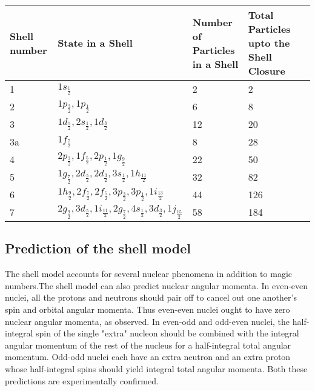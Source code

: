 \begin{table}[H]
	\centering
	\renewcommand*{\arraystretch}{1.2}
	\begin{tabular}{|p{2cm}| p{5cm}|p{2cm}|p{2cm}|p{2.5cm}|}
		\hline	
Shell number&State in a Shell&Number of Particles in a Shell&Total Particles upto the Shell Closure\\
\hline
1&$1 s_{\frac{1}{2}}$&2&2\\
2&$1 p_{\frac{3}{2}}, 1 p_{\frac{1}{2}}$&6&8\\
3&$1 d_{\frac{5}{2}}, 2 s_{\frac{1}{2}}, 1 d_{\frac{3}{2}}$&12&20\\
3a&$1 f_{\frac{7}{2}}$&8&28\\
4&$2 p_{\frac{3}{2}}, 1 f_{\frac{5}{2}}, 2 p_{\frac{1}{2}}, 1 g_{\frac{9}{2}}$&22&50\\
5&$1 g_{\frac{7}{2}}, 2 d_{\frac{5}{2}}, 2 d_{\frac{3}{2}}, 3 s_{\frac{1}{2}}, 1 h_{\frac{11}{2}}$&32&82\\
6&$1 h_{\frac{9}{2}}, 2 f_{\frac{7}{2}}, 2 f_{\frac{5}{2}}, 3 p_{\frac{3}{2}}, 3 p_{\frac{1}{2}}, 1 i_{\frac{13}{2}}$&44&126\\
7&$2 g_{\frac{9}{2}}, 3 d_{\frac{5}{2}}, 1 i_{\frac{11}{2}}, 2 g_{\frac{7}{2}}, 4 s_{\frac{1}{2}}, 3 d_{\frac{3}{2}}, 1 j_{\frac{15}{2}}$&58&184\\
\hline
	\end{tabular}
\end{table}
\subsection{Prediction of the shell model}
The shell model accounts for several nuclear phenomena in addition to magic numbers.The shell model can also predict nuclear angular momenta. In even-even nuclei, all the protons and neutrons should pair off to cancel out one another's spin and orbital angular momenta. Thus even-even nuclei ought to have zero nuclear angular momenta, as observed. In even-odd and odd-even nuclei, the half-integral spin of the single "extra" nucleon should be combined with the integral angular momentum of the rest of the nucleus for a half-integral total angular momentum. Odd-odd nuclei each have an extra neutron and an extra proton whose half-integral spins should yield integral total angular momenta. Both these predictions are experimentally confirmed.
